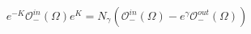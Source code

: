 \begin{equation}
e^{-K}\mathcal{O}^{in}_-(\Omega)
e^K=
N_{\gamma}(\mathcal{O}^{in}_-(\Omega)
-e^{\gamma}\mathcal{O}^{out}_-(\Omega))
\end{equation}

